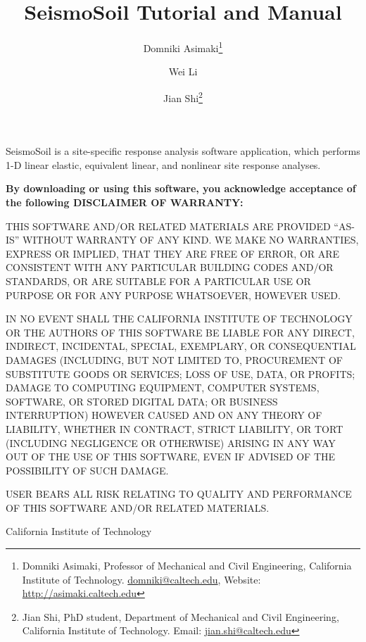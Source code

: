\documentclass[11pt,letterpaper]{article}
\title{\textbf{\textsf{\huge{SeismoSoil Tutorial and Manual}}}}
\author{{\textsf{\Large{Domniki Asimaki}}}\thanks{Domniki Asimaki, Professor of Mechanical and Civil Engineering, California Institute of Technology.  \href{mailto:domniki@caltech.edu}{\textsf{domniki@caltech.edu}}, Website: \href{http://asimaki.caltech.edu}{\textsf{http://asimaki.caltech.edu}}}  \and {\textsf{\Large{Wei Li}}}\and {\textsf{\Large{Jian Shi}}}\thanks{Jian Shi, PhD student, Department of Mechanical and Civil Engineering, California Institute of Technology. Email: \href{mailto:jian.shi@caltech.edu}{\textsf{jian.shi@caltech.edu}}}}
\date{}
\begin{document}
  \maketitle
  \thispagestyle{empty}    %
SeismoSoil is a site-specific response analysis software application, which performs 1-D linear elastic, equivalent linear, and nonlinear site response analyses.

\begin{framed}
	\begin{center}
		\textbf{By downloading or using this software, you acknowledge acceptance of the following DISCLAIMER OF WARRANTY:}
	\end{center}
	
	{\sffamily
			THIS SOFTWARE AND/OR RELATED MATERIALS ARE PROVIDED ``AS-IS'' WITHOUT WARRANTY OF ANY KIND. WE MAKE NO WARRANTIES, EXPRESS OR IMPLIED, THAT THEY ARE FREE OF ERROR, OR ARE CONSISTENT WITH ANY PARTICULAR BUILDING CODES AND/OR STANDARDS, OR ARE SUITABLE FOR A PARTICULAR USE OR PURPOSE OR FOR ANY PURPOSE WHATSOEVER, HOWEVER USED.
			
			IN NO EVENT SHALL THE CALIFORNIA INSTITUTE OF TECHNOLOGY OR THE AUTHORS OF THIS SOFTWARE BE LIABLE FOR ANY DIRECT, INDIRECT, INCIDENTAL, SPECIAL, EXEMPLARY, OR CONSEQUENTIAL DAMAGES (INCLUDING, BUT NOT LIMITED TO, PROCUREMENT OF SUBSTITUTE GOODS OR SERVICES; LOSS OF USE, DATA, OR PROFITS; DAMAGE TO COMPUTING EQUIPMENT, COMPUTER SYSTEMS, SOFTWARE, OR STORED DIGITAL DATA; OR BUSINESS INTERRUPTION) HOWEVER CAUSED AND ON ANY THEORY OF LIABILITY, WHETHER IN CONTRACT, STRICT LIABILITY, OR TORT (INCLUDING NEGLIGENCE OR OTHERWISE) ARISING IN ANY WAY OUT OF THE USE OF THIS SOFTWARE, EVEN IF ADVISED OF THE POSSIBILITY OF SUCH DAMAGE.
			
			USER BEARS ALL RISK RELATING TO QUALITY AND PERFORMANCE OF THIS SOFTWARE AND/OR RELATED MATERIALS.
			
	}
	
	\vspace{0.5cm}
\end{framed}

\begin{center}
	\textcopyright{} California Institute of Technology
\end{center}
\end{document}

